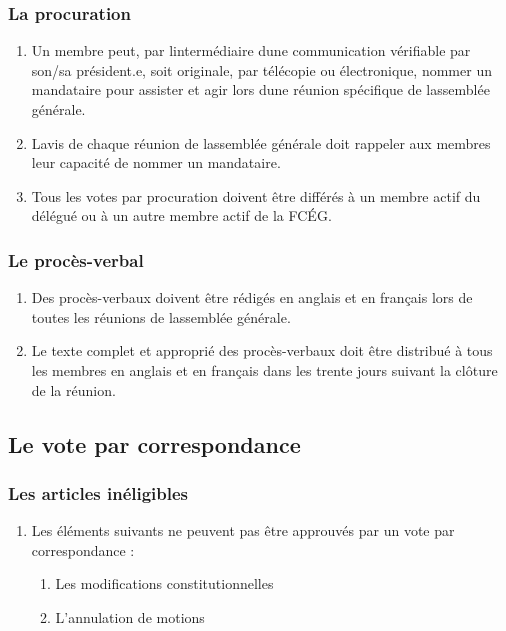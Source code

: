 \subsubsection{La procuration}
\label{la-procuration}

\begin{enumerate}
 \item
  Un membre peut, par l\textquotesingle intermédiaire d\textquotesingle une communication vérifiable par son/sa président.e, soit originale, par télécopie ou électronique, nommer un mandataire pour assister et agir lors d\textquotesingle une réunion spécifique de l\textquotesingle assemblée générale.
 \item
  L\textquotesingle avis de chaque réunion de l\textquotesingle assemblée générale doit rappeler aux membres leur capacité de nommer un mandataire.
 \item
  Tous les votes par procuration doivent être différés à un membre actif du délégué ou à un autre membre actif de la FCÉG.
\end{enumerate}

\subsubsection{Le procès-verbal}
\label{le-proces-verbal}

\begin{enumerate}
 \item
  Des procès-verbaux doivent être rédigés en anglais et en français lors de toutes les réunions de l\textquotesingle assemblée générale.
 \item
  Le texte complet et approprié des procès-verbaux doit être distribué à tous les membres en anglais et en français dans les trente jours suivant la clôture de la réunion.
\end{enumerate}

\subsection{Le vote par correspondance}
\label{le-vote-par-correspondance}

\subsubsection{Les articles inéligibles}
\label{les-articles-ineligibles}

\begin{enumerate}
 \item
  Les éléments suivants ne peuvent pas être approuvés par un vote par correspondance :

  \begin{enumerate}
   \item
    Les modifications constitutionnelles
   \item
    L'annulation de motions
  \end{enumerate}
\end{enumerate}

